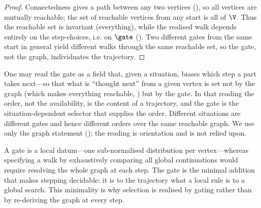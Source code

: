 \begin{proof}
Connectedness gives a path between any two vertices (), so all
vertices are mutually reachable; the set of reachable vertices from any start is
all of $\V$. Thus the reachable set is invariant (everything), while the realised
walk depends entirely on the step-choices, i.e. on $\gate$ ().
Two different gates from the same start in general yield different walks through
the same reachable set, so the gate, not the graph, individuates the trajectory.
\end{proof}

\begin{remark}
\label{rem:field}
One may read the gate as a field that, given a situation, biases which step a
part takes next---so that what is ``thought next'' from a given vertex is set not
by the graph (which makes everything reachable, ) but by
the gate. In that reading the order, not the availability, is the content of a
trajectory, and the gate is the situation-dependent selector that supplies the
order. Different situations are different gates and hence different orders over
the same reachable graph. We use only the graph statement
\textup{(}\textup{)}; the reading is
orientation and is not relied upon.
\end{remark}

\begin{remark}
\label{rem:gate-cheap}
A gate is a local datum---one sub-normalised distribution per vertex---whereas
specifying a walk by exhaustively comparing all global continuations would
require resolving the whole graph at each step. The gate is the minimal addition
that makes stepping decidable: it is to the trajectory what a local rule is to a
global search. This minimality is why selection is realised by gating rather than
by re-deriving the graph at every step.
\end{remark}
